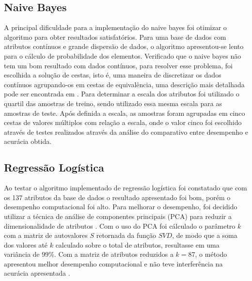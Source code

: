 \documentclass[10pt, conference, compsocconf]{IEEEtran}
\begin{document}
\subsection{Naive Bayes}
A principal dificuldade para a implementação do naive bayes foi otimizar o algoritmo para obter resultados satisfatórios. Para uma base de dados com atributos contínuos e grande dispersão de dados, o algoritmo apresentou-se lento para o cálculo de probabilidade dos elementos. 
Verificado que o naive bayes não tem um bom resultado com dados contínuos, para resolver esse problema, foi escolhida a solução de cestas, isto é, uma maneira de discretizar os dados contínuos agrupando-os em cestas de equivalência, uma descrição mais detalhada pode ser encontrada em \cite{8}. 
Para determinar a escala dos atributos foi utilizado o quartil das amostras de treino, sendo utilizado essa mesma escala para as amostras de teste. Após definida a escala, as amostras foram agrupadas em cinco cestas de valores múltiplos com relação a escala, onde o valor cinco foi escolhido através de testes realizados através da análise do comparativo entre desempenho e acurácia obtida.
\subsection{Regressão Logística}
Ao testar o algoritmo implementado de regressão logística foi constatado que com os 137 atributos da base de dados o resultado apresentado foi bom, porém o desempenho computacional foi alto. Para melhorar o desempenho, foi decidido utilizar a técnica de análise de componentes principais (PCA) para reduzir a dimensionalidade de atributos \cite{9}. 
Com o uso do PCA foi cálculado o parâmetro $k$ com a matriz de autovalores $S$ retornada da função $SVD$, de modo que a soma dos valores até $k$ calculado sobre o total de atributos, resultasse em uma variância de 99\%. Com a matriz de atributos reduzidos a $k=87$, o  método apresentou melhor desempenho computacional e não teve interferência na acurácia apresentada . 
\end{document}
